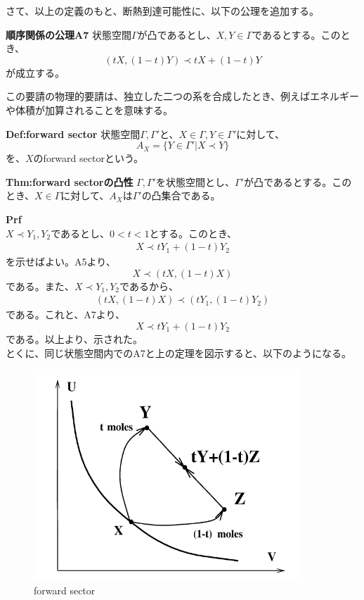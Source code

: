 \documentclass[a4paper,11pt]{jsarticle}
\numberwithin{equation}{section}
\begin{document}
さて、以上の定義のもと、断熱到達可能性に、以下の公理を追加する。\\
\begin{itembox}[l]{\textbf{順序関係の公理A7}}
    状態空間$\Gamma$が凸であるとし、$X,Y \in \Gamma$であるとする。このとき、
    \begin{equation}
        (tX,(1-t)Y) \prec tX+(1-t)Y
    \end{equation}
    が成立する。
\end{itembox}
この要請の物理的要請は、独立した二つの系を合成したとき、例えばエネルギーや体積が加算されることを意味する。

\begin{itembox}[l]{\textbf{Def:forward sector}}
    状態空間$\Gamma,\Gamma'$と、$X \in \Gamma,Y \in \Gamma'$に対して、
    \begin{equation}
        A_X = \{Y \in \Gamma'|X \prec Y\}
    \end{equation}
    を、$X$のforward sectorという。
\end{itembox}
\begin{itembox}[l]{\textbf{Thm:forward sectorの凸性}}
    $\Gamma,\Gamma'$を状態空間とし、$\Gamma '$が凸であるとする。このとき、$X \in \Gamma$に対して、$A_X$は$\Gamma'$の凸集合である。
\end{itembox}
\textbf{Prf}\\
$X \prec Y_1,Y_2$であるとし、$0 < t < 1$とする。このとき、
\begin{align}
    X \prec tY_1+(1-t)Y_2
\end{align}
を示せばよい。A5より、
\begin{equation}
    X \prec (tX,(1-t)X)
\end{equation}
である。また、$X \prec Y_1,Y_2$であるから、
\begin{align}
    (tX,(1-t)X) \prec (tY_1,(1-t)Y_2)
\end{align}
である。これと、A7より、
\begin{equation}
    X \prec tY_1+(1-t)Y_2
\end{equation}
である。以上より、示された。\hfill\qedsymbol\\
とくに、同じ状態空間内でのA7と上の定理を図示すると、以下のようになる。\\
\begin{figure}[H]
    \begin{center}
    \includegraphics[width=100mm]{fig3.png}
    \end{center}
    \caption{forward sector}
    \label{fig:two}
\end{figure}
\end{document}
